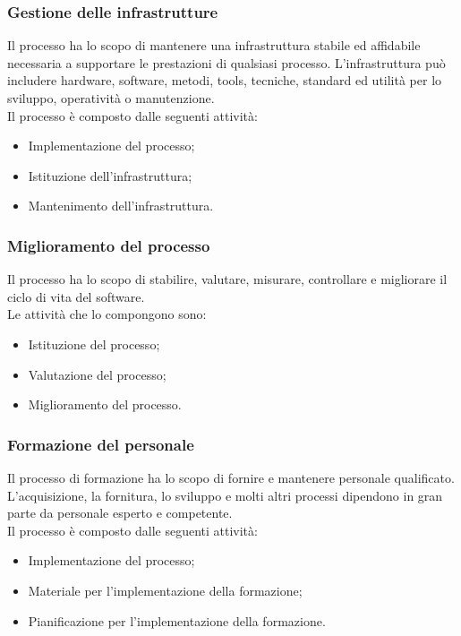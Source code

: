 \subsubsection{Gestione delle infrastrutture}
Il processo ha lo scopo di mantenere una infrastruttura stabile ed affidabile necessaria a supportare le prestazioni di qualsiasi processo. L'infrastruttura può includere hardware, software, metodi, tools, tecniche, standard ed utilità per lo sviluppo, operatività o manutenzione.\\
Il processo è composto dalle seguenti attività:
\begin{itemize}
	\item Implementazione del processo;
	
	\item Istituzione dell'infrastruttura;
	
	\item Mantenimento dell'infrastruttura.
\end{itemize}

\subsubsection{Miglioramento del processo}
Il processo ha lo scopo di stabilire, valutare, misurare, controllare e migliorare il ciclo di vita del software.\\
Le attività che lo compongono sono:
\begin{itemize}
	\item Istituzione del processo;
	
	\item Valutazione del processo;
	
	\item Miglioramento del processo.
\end{itemize}

\subsubsection{Formazione del personale}
Il processo di formazione ha lo scopo di fornire e mantenere personale qualificato. L'acquisizione, la fornitura, lo sviluppo e molti altri processi dipendono in gran parte da personale esperto e competente.\\
Il processo è composto dalle seguenti attività:
\begin{itemize}
	\item Implementazione del processo;
	
	\item Materiale per l'implementazione della formazione;
	
	\item Pianificazione per l'implementazione della formazione.
\end{itemize}



